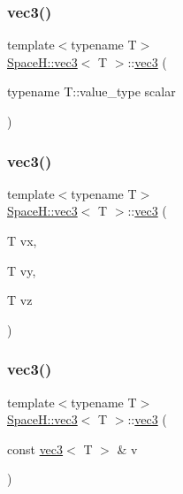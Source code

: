 \subsubsection{\texorpdfstring{vec3()}{vec3()}\hspace{0.1cm}{\footnotesize\ttfamily [3/14]}}
{\footnotesize\ttfamily template$<$typename T$>$ \\
\mbox{\hyperlink{struct_space_h_1_1vec3}{Space\+H\+::vec3}}$<$ T $>$\+::\mbox{\hyperlink{struct_space_h_1_1vec3}{vec3}} (\begin{DoxyParamCaption}\item[{typename T\+::value\+\_\+type}]{scalar }\end{DoxyParamCaption})\hspace{0.3cm}{\ttfamily [inline]}}

\mbox{\label{struct_space_h_1_1vec3_a9441fda82b87e8b91167dc6e5e3039a2}} 
\subsubsection{\texorpdfstring{vec3()}{vec3()}\hspace{0.1cm}{\footnotesize\ttfamily [4/14]}}
{\footnotesize\ttfamily template$<$typename T$>$ \\
\mbox{\hyperlink{struct_space_h_1_1vec3}{Space\+H\+::vec3}}$<$ T $>$\+::\mbox{\hyperlink{struct_space_h_1_1vec3}{vec3}} (\begin{DoxyParamCaption}\item[{T}]{vx,  }\item[{T}]{vy,  }\item[{T}]{vz }\end{DoxyParamCaption})\hspace{0.3cm}{\ttfamily [inline]}}

\mbox{\label{struct_space_h_1_1vec3_ae3f72473af782f642108ed5c87263657}} 
\subsubsection{\texorpdfstring{vec3()}{vec3()}\hspace{0.1cm}{\footnotesize\ttfamily [5/14]}}
{\footnotesize\ttfamily template$<$typename T$>$ \\
\mbox{\hyperlink{struct_space_h_1_1vec3}{Space\+H\+::vec3}}$<$ T $>$\+::\mbox{\hyperlink{struct_space_h_1_1vec3}{vec3}} (\begin{DoxyParamCaption}\item[{const \mbox{\hyperlink{struct_space_h_1_1vec3}{vec3}}$<$ T $>$ \&}]{v }\end{DoxyParamCaption})\hspace{0.3cm}{\ttfamily [inline]}}

